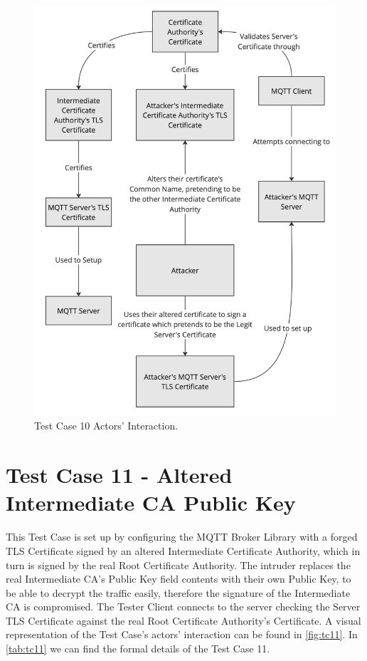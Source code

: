 \documentclass[binding=0.6cm,noexaminfo]{sapthesis}
\begin{document}
\begin{figure}[htb]
	\includegraphics[width=14cm]{TC10}
	\caption{Test Case 10 Actors' Interaction.}
	\label{fig:tc10}
\end{figure}

\section{Test Case 11 - Altered Intermediate CA Public Key}
This Test Case is set up by configuring the MQTT Broker Library with a forged TLS Certificate signed by an altered Intermediate Certificate Authority, which in turn is signed by the real Root Certificate Authority. The intruder replaces the real Intermediate CA’s Public Key field contents with their own Public Key, to be able to decrypt the traffic easily, therefore the signature of the Intermediate CA is compromised. The Tester Client connects to the server checking the Server TLS Certificate against the real Root Certificate Authority’s Certificate. A visual representation of the Test Case's actors' interaction can be found in \autoref{fig:tc11}.  In \autoref{tab:tc11} we can find the formal details of the Test Case 11.
\end{document}
